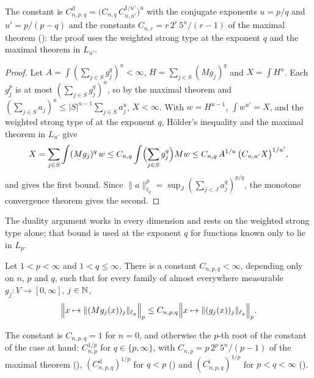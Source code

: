 The constant is
$C^{\mathrm d}_{n,p,q} = \bigl( C_{n,q} \, C_{n,u'}^{1/u'} \bigr)^{u}$ with the conjugate
exponents $u = p/q$ and $u' = p/(p - q)$ and the constants $C_{n,r} = r \, 2^r \, 5^n / (r - 1)$
of the maximal theorem (): the proof uses the weighted strong type
at the exponent $q$ and the maximal theorem in $L_{u'}$.

\begin{proof}
\leanok
Let $A = \int (\sum_{j \in S} g_j^q)^u < \infty$, $H = \sum_{j \in S} (M g_j)^q$ and
$X = \int H^u$. Each $g_j^p$ is at most $(\sum_{j \in S} g_j^q)^u$, so by the maximal theorem
and $(\sum_{j \in S} a_j)^u \leq |S|^{u-1} \sum_{j \in S} a_j^u$, $X < \infty$. With
$w = H^{u-1}$, $\int w^{u'} = X$, and the weighted strong type of 
at the exponent $q$, H\"older's inequality and the maximal theorem in $L_{u'}$ give
\[
  X = \sum_{j \in S} \int (M g_j)^q \, w
  \leq C_{n,q} \int \Bigl( \sum_{j \in S} g_j^q \Bigr) M w
  \leq C_{n,q} \, A^{1/u} \, \bigl( C_{n,u'} X \bigr)^{1/u'} ,
\]
and  gives the first bound. Since
$\|a\|_{\ell_q}^p = \sup_J (\sum_{j < J} a_j^q)^{p/q}$, the monotone convergence theorem gives the
second.
\end{proof}

The duality argument works in every dimension and rests on the weighted strong type alone;
that bound is used at the exponent $q$ for functions known only to lie in $L_p$.

\begin{theorem}
\label{thm:fefferman-stein}
\leanok
{}
Let $1 < p < \infty$ and $1 < q \leq \infty$. There is a constant $C_{n,p,q} < \infty$, depending
only on $n$, $p$ and $q$, such that for every family of almost everywhere measurable
$g_j : V \to [0, \infty]$, $j \in \mathbb{N}$,
\[
  \Bigl\| x \mapsto \|(M g_j(x))_j\|_{\ell_q} \Bigr\|_p
  \leq C_{n,p,q} \Bigl\| x \mapsto \|(g_j(x))_j\|_{\ell_q} \Bigr\|_p .
\]
\end{theorem}

The constant is $C_{n,p,q} = 1$ for $n = 0$, and otherwise the $p$-th root of the constant of
the case at hand: $C_{n,p}^{1/p}$ for $q \in \{p, \infty\}$, with
$C_{n,p} = p \, 2^p \, 5^n / (p - 1)$ of the maximal theorem (),
$(C^{\mathrm d}_{n,p,q})^{1/p}$ for $q < p$ () and
$(C^{\mathrm i}_{n,p,q})^{1/p}$ for $p < q < \infty$ ().

